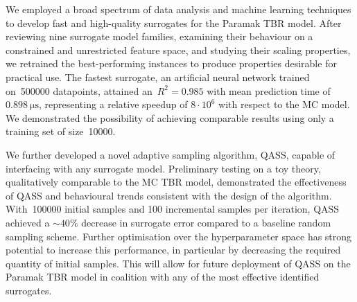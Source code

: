 We employed a broad spectrum of data
analysis and machine learning techniques to develop fast and high-quality
surrogates for the Paramak TBR model. After reviewing
nine surrogate model families, examining their behaviour on a constrained and
unrestricted feature space, and studying their scaling properties, we retrained
the best-performing instances to produce properties desirable for
practical use. The fastest surrogate, an artificial neural network trained
on~\num{500000} datapoints, attained an~$R^2=\num{0.985}$ with mean prediction time
of~$\SI{0.898}{\micro\second}$, representing a relative
speedup of $8\cdot 10^6$ with respect to the MC model. We demonstrated the possibility of achieving comparable results using only a
training set of size~\num{10000}.

We further developed a novel adaptive
sampling algorithm, QASS, capable of interfacing with any surrogate model.
Preliminary testing on a toy theory, qualitatively comparable to
the MC TBR model, demonstrated the effectiveness of QASS and behavioural trends
consistent with the design of the algorithm. With~\num{100000} initial samples
and 100 incremental samples per iteration, QASS achieved a ${\sim}40\%$ decrease
in surrogate error compared to a baseline random sampling scheme. Further optimisation over the hyperparameter space has strong potential to increase this performance, in particular by decreasing the required quantity of initial samples. This will allow for future deployment of QASS on the Paramak TBR model in coalition with any of the most effective identified surrogates.


